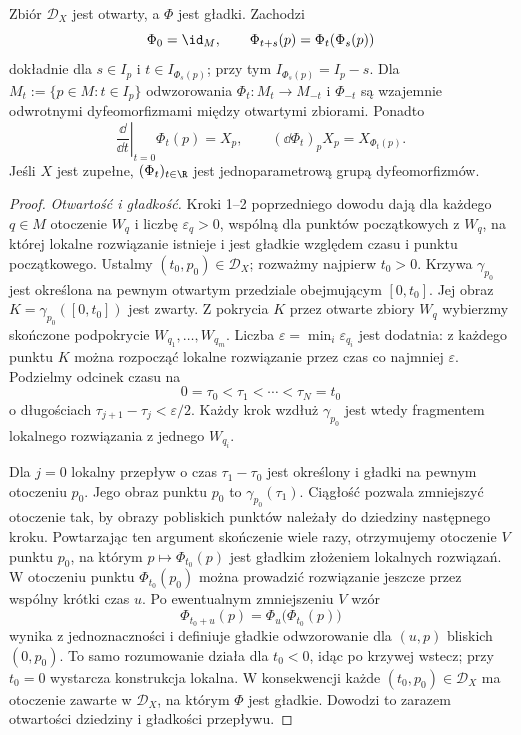 \begin{twierdzenie}
\label{thm:przeplyw}
Zbiór $\mathcal D_X$ jest otwarty, a $\Phi$ jest gładki. Zachodzi
\[
 \Phi_0=\id_M,\qquad
 \Phi_{t+s}(p)=\Phi_t(\Phi_s(p))
\]
dokładnie dla $s\in I_p$ i $t\in I_{\Phi_s(p)}$; przy tym
$I_{\Phi_s(p)}=I_p-s$. Dla $M_t:=\{p\in M:t\in I_p\}$
odwzorowania $\Phi_t\colon M_t\to M_{-t}$ i $\Phi_{-t}$ są wzajemnie
odwrotnymi dyfeomorfizmami między otwartymi zbiorami. Ponadto
\begin{equation}\label{eq:przeplyw-generuje}
 \left.\frac{\dd}{\dd t}\right|_{t=0}\Phi_t(p)=X_p,
 \qquad (\dd\Phi_t)_pX_p=X_{\Phi_t(p)}.
\end{equation}
Jeśli $X$ jest zupełne, $(\Phi_t)_{t\in\R}$ jest jednoparametrową
grupą dyfeomorfizmów.
\end{twierdzenie}
\begin{proof}
\emph{Otwartość i gładkość.}
Kroki 1--2 poprzedniego dowodu dają dla każdego $q\in M$
otoczenie $W_q$ i liczbę $\varepsilon_q>0$, wspólną
dla punktów początkowych z $W_q$, na której lokalne
rozwiązanie istnieje i jest gładkie względem czasu
i punktu początkowego.
Ustalmy $(t_0,p_0)\in\mathcal D_X$; rozważmy najpierw
$t_0>0$. Krzywa $\gamma_{p_0}$ jest określona
na pewnym otwartym przedziale obejmującym $[0,t_0]$.
Jej obraz $K=\gamma_{p_0}([0,t_0])$ jest zwarty.
Z pokrycia $K$ przez otwarte zbiory $W_q$ wybierzmy
skończone podpokrycie $W_{q_1},\ldots,W_{q_m}$.
Liczba $\varepsilon=\min_i\varepsilon_{q_i}$ jest dodatnia:
z każdego punktu $K$ można rozpocząć lokalne
rozwiązanie przez czas co najmniej $\varepsilon$.
Podzielmy odcinek czasu na
\[
 0=\tau_0<\tau_1<\cdots<\tau_N=t_0
\]
o długościach $\tau_{j+1}-\tau_j<\varepsilon/2$.
Każdy krok wzdłuż $\gamma_{p_0}$ jest wtedy
fragmentem lokalnego rozwiązania z jednego $W_{q_i}$.

Dla $j=0$ lokalny przepływ o czas
$\tau_1-\tau_0$ jest określony i gładki na pewnym
otoczeniu $p_0$. Jego obraz punktu $p_0$ to
$\gamma_{p_0}(\tau_1)$. Ciągłość pozwala zmniejszyć
otoczenie tak, by obrazy pobliskich punktów
należały do dziedziny następnego kroku. Powtarzając
ten argument skończenie wiele razy, otrzymujemy
otoczenie $V$ punktu $p_0$, na którym
$p\mapsto\Phi_{t_0}(p)$ jest gładkim złożeniem
lokalnych rozwiązań. W otoczeniu punktu
$\Phi_{t_0}(p_0)$ można prowadzić rozwiązanie
jeszcze przez wspólny krótki czas $u$.
Po ewentualnym zmniejszeniu $V$ wzór
\[
 \Phi_{t_0+u}(p)
 =\Phi_u\bigl(\Phi_{t_0}(p)\bigr)
\]
wynika z jednoznaczności i definiuje gładkie odwzorowanie
dla $(u,p)$ bliskich $(0,p_0)$. To samo rozumowanie
działa dla $t_0<0$, idąc po krzywej wstecz; przy
$t_0=0$ wystarcza konstrukcja lokalna.
W konsekwencji każde $(t_0,p_0)\in\mathcal D_X$
ma otoczenie zawarte w $\mathcal D_X$, na którym
$\Phi$ jest gładkie. Dowodzi to zarazem otwartości
dziedziny i gładkości przepływu.


\end{proof}
